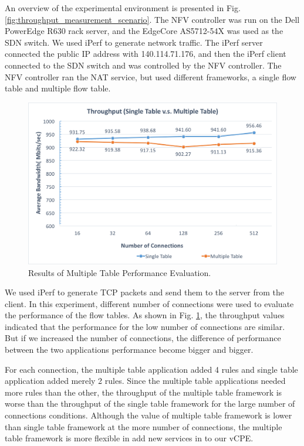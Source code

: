 An overview of the experimental environment is presented in Fig. \ref{fig:throughput_measurement_scenario}.
The NFV controller was run on the Dell PowerEdge R630 rack server, and the EdgeCore AS5712-54X \cite{edge-core-switch} was used as the SDN switch.
We used iPerf \cite{iperf} to generate network traffic.
The iPerf server connected the public IP address with 140.114.71.176, and then the iPerf client connected to the SDN switch and was controlled by the NFV controller.
The NFV controller ran the NAT service, but used different frameworks, a single flow table and multiple flow table.

\begin{figure}[!t]
\centering
\includegraphics[width=\textwidth]{./fig/throughput_measurement.png}
\caption{Results of Multiple Table Performance Evaluation.}
\label{fig:throughput_measurement}
\end{figure}

We used iPerf to generate TCP packets and send them to the server from the client.
In this experiment, different number of connections were used to evaluate the performance of the flow tables.
As shown in Fig. \ref{fig:throughput_measurement}, the throughput values indicated that the performance for the low number of connections are similar.
But if we increased the number of connections, the difference of performance between the two applications performance become bigger and bigger.

For each connection, the multiple table application added 4 rules and single table application added merely 2 rules. Since the multiple table applications needed more rules than the other, the throughput of the multiple table framework is worse than the throughput of the single table framework for the large number of connections conditions.
Although the value of multiple table framework is lower than single table framework at the more number of connections, the multiple table framework is more flexible in add new services in to our vCPE.


